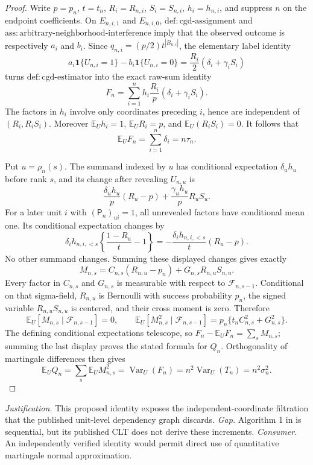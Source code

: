 \documentclass{article}
\begin{document}
\begin{proof}
Write \(p=p_n\), \(t=t_n\), \(R_i=R_{n,i}\), \(S_i=S_{n,i}\), \(h_i=h_{n,i}\), and suppress \(n\) on the endpoint coefficients.  On \(E_{n,i,1}\) and \(E_{n,i,0}\), \(\mathrm{def:cgd\text{-}assignment}\) and \(\mathrm{ass:arbitrary\text{-}neighborhood\text{-}interference}\) imply that the observed outcome is respectively \(a_i\) and \(b_i\).  Since \(q_{n,i}=(p/2)t^{|B_{n,i}|}\), the elementary label identity
\[
 a_i\mathbf 1\{U_{n,i}=1\}-b_i\mathbf 1\{U_{n,i}=0\}
 =\frac{R_i}{2}(\delta_i+\gamma_iS_i)
\]
turns \(\mathrm{def:cgd\text{-}estimator}\) into the exact raw-sum identity
\[
 F_n=\sum_{i=1}^nh_i\frac{R_i}{p}(\delta_i+\gamma_iS_i).
\]
The factors in \(h_i\) involve only coordinates preceding \(i\), hence are independent of \((R_i,R_iS_i)\).  Moreover \(\mathbb E_Uh_i=1\), \(\mathbb E_UR_i=p\), and \(\mathbb E_U(R_iS_i)=0\).  It follows that
\[
 \mathbb E_UF_n=\sum_{i=1}^n\delta_i=n\tau_n.
\]

Put \(u=\rho_n(s)\).  The summand indexed by \(u\) has conditional expectation \(\delta_u h_u\) before rank \(s\), and its change after revealing \(U_{n,u}\) is
\[
 \frac{\delta_uh_u}{p}(R_u-p)+\frac{\gamma_uh_u}{p}R_uS_u.
\]
For a later unit \(i\) with \((\mathsf P_n)_{u i}=1\), all unrevealed factors have conditional mean one.  Its conditional expectation changes by
\[
 \delta_i h_{n,i,<s}\left\{\frac{1-R_u}{t}-1\right\}
 =-\frac{\delta_i h_{n,i,<s}}{t}(R_u-p).
\]
No other summand changes.  Summing these displayed changes gives exactly
\[
 M_{n,s}=C_{n,s}(R_{n,u}-p_n)+G_{n,s}R_{n,u}S_{n,u}.
\]
Every factor in \(C_{n,s}\) and \(G_{n,s}\) is measurable with respect to \(\mathcal F_{n,s-1}\).  Conditional on that sigma-field, \(R_{n,u}\) is Bernoulli with success probability \(p_n\), the signed variable \(R_{n,u}S_{n,u}\) is centered, and their cross moment is zero.  Therefore
\[
 \mathbb E_U[M_{n,s}\mid\mathcal F_{n,s-1}]=0,\qquad
 \mathbb E_U[M_{n,s}^2\mid\mathcal F_{n,s-1}]
 =p_n\{t_nC_{n,s}^2+G_{n,s}^2\}.
\]
The defining conditional expectations telescope, so \(F_n-\mathbb E_UF_n=\sum_sM_{n,s}\); summing the last display proves the stated formula for \(Q_n\).  Orthogonality of martingale differences then gives
\[
 \mathbb E_UQ_n=\sum_s\mathbb E_UM_{n,s}^2
 =\operatorname{Var}_U(F_n)=n^2\operatorname{Var}_U(T_n)=n^2\sigma_n^2.
\]
\end{proof}
\par\smallskip\noindent \textit{Justification.} This proposed identity exposes the independent-coordinate filtration that the published unit-level dependency graph discards. \textit{Gap.} Algorithm 1 in \cite{KandirosPipisDaskalakisHarshaw2024CGD} is sequential, but its published CLT does not derive these increments. \textit{Consumer.} An independently verified identity would permit direct use of quantitative martingale normal approximation.
\end{document}
